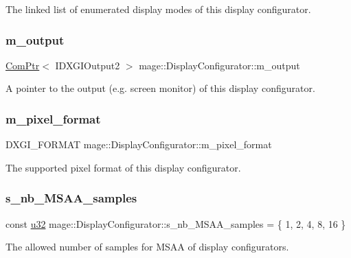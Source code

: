 The linked list of enumerated display modes of this display configurator. \hypertarget{classmage_1_1_display_configurator_a181e657b9ce888d3580c9fdbb50898e2}{}\label{classmage_1_1_display_configurator_a181e657b9ce888d3580c9fdbb50898e2} 
\subsubsection{\texorpdfstring{m\+\_\+output}{m\_output}}
{\footnotesize\ttfamily \hyperlink{namespacemage_ae74f374780900893caa5555d1031fd79}{Com\+Ptr}$<$ I\+D\+X\+G\+I\+Output2 $>$ mage\+::\+Display\+Configurator\+::m\+\_\+output\hspace{0.3cm}{\ttfamily [private]}}

A pointer to the output (e.\+g. screen monitor) of this display configurator. \hypertarget{classmage_1_1_display_configurator_a22998ef4e54c3da0118a734164792b8f}{}\label{classmage_1_1_display_configurator_a22998ef4e54c3da0118a734164792b8f} 
\subsubsection{\texorpdfstring{m\+\_\+pixel\+\_\+format}{m\_pixel\_format}}
{\footnotesize\ttfamily D\+X\+G\+I\+\_\+\+F\+O\+R\+M\+AT mage\+::\+Display\+Configurator\+::m\+\_\+pixel\+\_\+format\hspace{0.3cm}{\ttfamily [private]}}

The supported pixel format of this display configurator. \hypertarget{classmage_1_1_display_configurator_a771f4899655925cb969ff876b2141e6c}{}\label{classmage_1_1_display_configurator_a771f4899655925cb969ff876b2141e6c} 
\subsubsection{\texorpdfstring{s\+\_\+nb\+\_\+\+M\+S\+A\+A\+\_\+samples}{s\_nb\_MSAA\_samples}}
{\footnotesize\ttfamily const \hyperlink{namespacemage_af2b398bf98eb10351f49cad73fe2cc73}{u32} mage\+::\+Display\+Configurator\+::s\+\_\+nb\+\_\+\+M\+S\+A\+A\+\_\+samples = \{ 1, 2, 4, 8, 16 \}\hspace{0.3cm}{\ttfamily [static]}}

The allowed number of samples for M\+S\+AA of display configurators. 